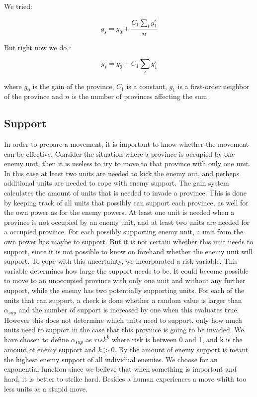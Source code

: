 \documentclass[a4paper]{article} %
\begin{document}
\begin{description}
We tried: 

$$ g_{s} = g_0 + \frac{ C_1 \sum_i g_1^i}{n}$$

But right now we do :

$$ g_{s} = g_0 + C_1 \sum_i g_1^i$$

where $g_0$ is the gain of the province, $C_1$ is a constant, $g_1$ is a first-order neighbor of the province and $n$ is the number of provinces affecting the sum. 


\subsection{Support}

In order to prepare a movement, it is important to know whether the movement can be effective. Consider the situation where a province is occupied by one enemy unit, then it is useless to try to move to that province with only one unit. In this case at least two units are needed to kick the enemy out, and perheps additional units are needed to cope with enemy support. The gain system calculates the amount of units that is needed to invade a province. This is done by keeping track of all units that possibly can support each province, as well for the own power as for the enemy powers. At least one unit is needed when a province is not occupied by an enemy unit, and at least two units are needed for a occupied province. For each possibly supporting enemy unit, a unit from the own power has maybe to support. But it is not certain whether this unit needs to support, since it is not possible to know on forehand whether the enemy unit will support. To cope with this uncertainty, we incorparated a risk variable. This variable determines how large the support needs to be. It could become possible to move to an unoccupied province with only one unit and without any further support, while the enemy has two potentially supporting units. For each of the units that can support, a check is done whether a random value is larger than $\alpha_{sup}$ and the number of support is increased by one when this evaluates true. However this does not determine which units need to support, only how much units need to support in the case that this province is going to be invaded. We have chosen to define $\alpha_{sup}$ as $risk^{k}$ where risk is between 0 and 1, and k is the amount of enemy support and $k>0$. By the amount of enemy support is meant the highest enemy support of all individual enemies. We choose for an exponential function since we believe that when something is important and hard, it is better to strike hard. Besides a human experiences a move whith too less units as a stupid move. 


\end{description}
\end{document}
